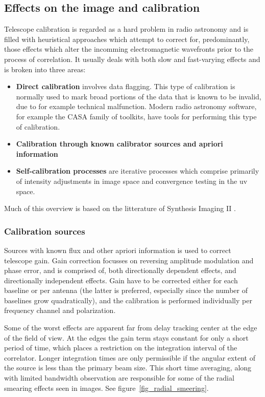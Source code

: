 \documentclass[a4paper,10pt]{report}
\begin{document}
\subsection{Effects on the image and calibration}
Telescope calibration is regarded as a hard problem in radio astronomy and is filled with heuristical approaches which attempt to correct for, predominantly, those effects which alter the
incomming electromagnetic wavefronts prior to the process of correlation. It usually deals with both slow and fast-varying effects and is broken into three areas:
\begin{itemize}
 \item \textbf{Direct calibration} involves data flagging. This type of calibration is normally used to mark broad portions of the data that is known to be invalid, due to for example
 technical malfunction. Modern radio astronomy software, for example the CASA family of toolkits, have tools for performing this type of calibration.
 \item \textbf{Calibration through known calibrator sources and apriori information} 
 \item \textbf{Self-calibration processes} are iterative processes which comprise primarily of intensity adjustments in image space and convergence testing in the uv space.
\end{itemize}

Much of this overview is based on the litterature of Synthesis Imaging II \cite[Lectures 5, 8 and 10]{taylor1999synthesis}.

\subsubsection{Calibration sources}
 Sources with known flux and other apriori information is used to correct telescope gain. Gain correction focusses on reversing amplitude modulation and phase error, and is 
 comprised of, both directionally dependent effects, and directionally independent effects. Gain have to be corrected either for each baseline or per antenna (the latter is 
 preferred, especially since the number of baselines grow quadratically), and the calibration is performed individually per frequency channel and polarization.
 
 Some of the worst effects are apparent far from delay tracking center at the edge of the field of view. At the edges the gain term stays constant for only a short period of time, which
 places a restriction on the integration interval of the correlator. Longer integration times are only permissible if the angular extent of the source is less than the primary beam size.
 This short time averaging, along with limited bandwidth observation are responsible for some of the radial smearing effects seen in images. See figure~\ref{fig_radial_smeering}.
 
\end{document}
